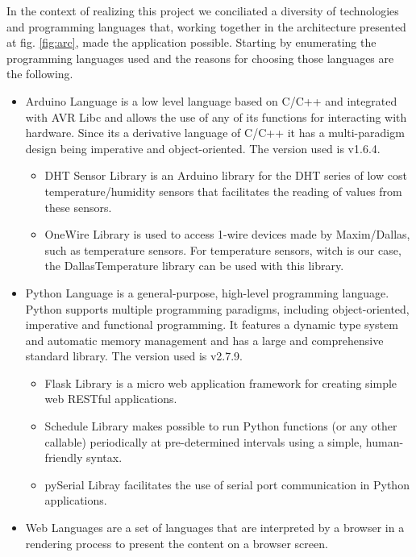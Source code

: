 \documentclass[12pt]{report}
\begin{document}
In the context of realizing this project we conciliated a diversity of technologies and programming languages that, working together in the architecture presented at fig. \ref{fig:arc}, made the application possible. Starting by enumerating the programming languages used and the reasons for choosing those languages are the following.
\begin{itemize}
\item Arduino Language\cite{arduinolang} is a low level language based on C/C++ and integrated with AVR Libc\cite{avr} and allows the use of any of its functions for interacting with hardware. Since its a derivative language of C/C++ it has a multi-paradigm design being imperative and object-oriented. The version used is v1.6.4. 
\begin{itemize}
\item DHT Sensor Library\cite{dhtada} is an Arduino library for the DHT series of low cost temperature/humidity sensors that facilitates the reading of values from these sensors.
\item OneWire Library\cite{pjrc} is used to access 1-wire devices made by Maxim/Dallas, such as temperature sensors. For temperature sensors, witch is our case, the DallasTemperature\cite{dallas} library can be used with this library.
\end{itemize}
\item Python Language\cite{pylang} is a general-purpose, high-level programming language. Python supports multiple programming paradigms, including object-oriented, imperative and functional programming. It features a dynamic type system and automatic memory management and has a large and comprehensive standard library. The version used is v2.7.9.
\begin{itemize}
\item Flask Library\cite{flask} is a micro web application framework for creating simple web RESTful applications.
\item Schedule Library\cite{schedule} makes possible to run Python functions (or any other callable) periodically at pre-determined intervals using a simple, human-friendly syntax.
\item pySerial Libray\cite{pyserial} facilitates the use of serial port communication in Python applications.
\end{itemize}
\item Web Languages\cite{moz} are a set of languages that are interpreted by a browser in a rendering process to present the content on a browser screen. 
\begin{itemize}

\end{itemize}
\end{itemize}
\end{document}
